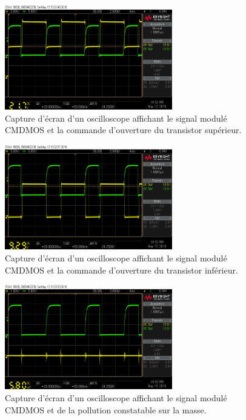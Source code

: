 \documentclass[10pt, oneside, a4paper]{article}
\begin{document}
\begin{figure}[p]
	\centering
	\includegraphics[width=0.65\textwidth]{image/12-05/scope_7.png}
	\caption{Capture d'écran d'un oscilloscope affichant le signal modulé CMDMOS et la
			 commande d'ouverture du transistor supérieur.}
	\label{fig:scope-7}
\end{figure}

\begin{figure}[p]
	\centering
	\includegraphics[width=0.65\textwidth]{image/12-05/scope_8.png}
	\caption{Capture d'écran d'un oscilloscope affichant le signal modulé CMDMOS et la
			 commande d'ouverture du transistor inférieur.}
	\label{fig:scope-8}
\end{figure}

\begin{figure}[p]
	\centering
	\includegraphics[width=0.65\textwidth]{image/12-05/scope_9.png}
	\caption{Capture d'écran d'un oscilloscope affichant le signal modulé CMDMOS et de
			 la pollution constatable sur la masse.}
	\label{fig:scope-9}
\end{figure}
\end{document}
